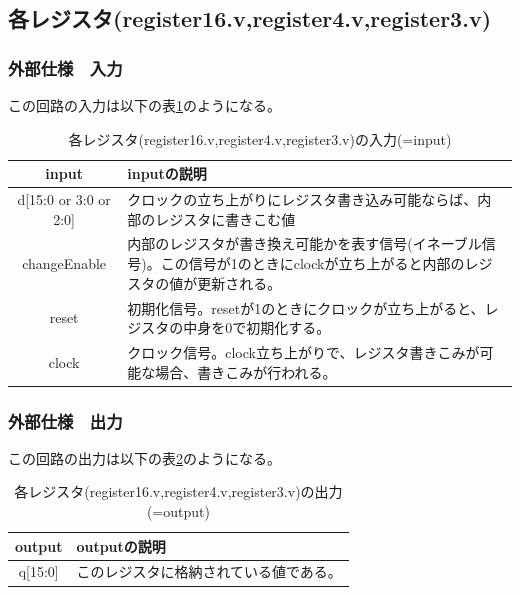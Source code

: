 \documentclass[a4j,titlepage]{jarticle}
\begin{document}
\newpage
\subsection{各レジスタ(register16.v,register4.v,register3.v)}

\subsubsection{外部仕様　入力}
この回路の入力は以下の表\ref{eachregisterI}のようになる。
\begin{table}[H]
    \caption{各レジスタ(register16.v,register4.v,register3.v)の入力(=input)}
    \label{eachregisterI}
    \begin{center}
    \begin {tabularx}{150mm}{|c|X|} \hline
         input & inputの説明 \\ \hline \hline
         d[15:0 or 3:0 or 2:0] & クロックの立ち上がりにレジスタ書き込み可能ならば、内部のレジスタに書きこむ値\\ \hline
         changeEnable & 内部のレジスタが書き換え可能かを表す信号(イネーブル信号)。この信号が1のときにclockが立ち上がると内部のレジスタの値が更新される。\\ \hline %
         reset & 初期化信号。resetが1のときにクロックが立ち上がると、レジスタの中身を0で初期化する。\\ \hline
         clock & クロック信号。clock立ち上がりで、レジスタ書きこみが可能な場合、書きこみが行われる。 \\ \hline
    \end{tabularx}
    \end{center}
\end{table}

\subsubsection{外部仕様　出力}
この回路の出力は以下の表\ref{eachregisterO}のようになる。
\begin{table}[H]
    \caption{各レジスタ(register16.v,register4.v,register3.v)の出力(=output)}
    \label{eachregisterO}
    \begin{center}
    \begin {tabularx}{150mm}{|c|X|} \hline
         output & outputの説明 \\ \hline \hline
         q[15:0] & このレジスタに格納されている値である。\\ \hline
    \end {tabularx}
    \end{center}
\end{table}
\end{document}
